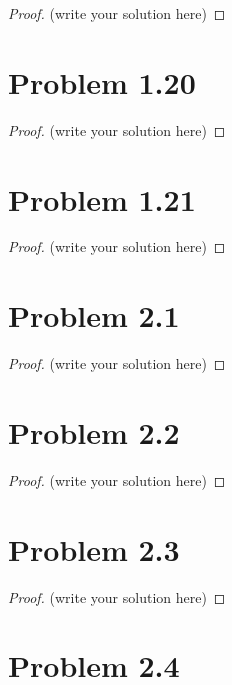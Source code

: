 \documentclass[12pt]{article}
\begin{document}
\begin{proof}
	(write your solution here)
\end{proof}

\newpage 

\section{Problem 1.20}

\begin{proof}
	(write your solution here)
\end{proof}

\newpage 

\section{Problem 1.21}

\begin{proof}
	(write your solution here)
\end{proof}

\newpage 

\section{Problem 2.1}

\begin{proof}
	(write your solution here)
\end{proof}

\newpage 

\section{Problem 2.2}

\begin{proof}
	(write your solution here)
\end{proof}

\newpage 

\section{Problem 2.3}

\begin{proof}
	(write your solution here)
\end{proof}

\newpage 

\section{Problem 2.4}
\end{document}
